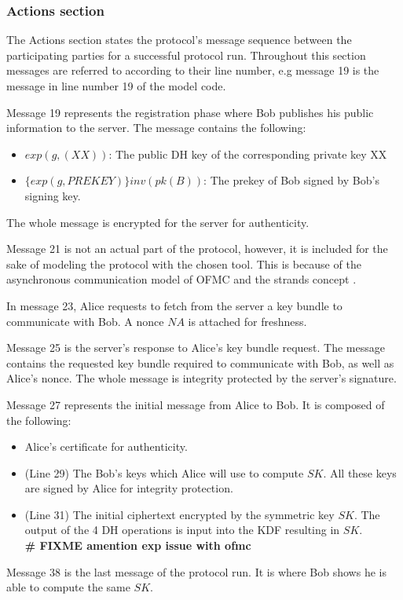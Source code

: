 \subsubsection{Actions section}
The Actions section states the protocol's message sequence between the participating parties for a successful protocol run. Throughout this section messages are referred to according to their line number, e.g message 19 is the message in line number 19 of the model code.
\par
Message 19 represents the registration phase where Bob publishes his public information to the server. The message contains the following:
\begin{itemize}
	\item $exp(g,(XX))$: The public DH key of the corresponding private key XX
	\item $\{exp(g,PREKEY)\}inv(pk(B))$: The prekey of Bob signed by Bob's signing key.
\end{itemize}
The whole message is encrypted for the server for authenticity.
\par
Message 21 is not an actual part of the protocol, however, it is included for the sake of modeling the protocol with the chosen tool. This is because of the asynchronous communication model of OFMC and the strands concept \cite{ofmcTut}.
\par 
In message 23, Alice requests to fetch from the server a key bundle to communicate with Bob. A nonce $NA$ is attached for freshness.
\par
Message 25 is the server's response to Alice's key bundle request. The message contains the requested key bundle required to communicate with Bob, as well as Alice's nonce. The whole message is integrity protected by the server's signature.
\par
Message 27 represents the initial message from Alice to Bob. It is composed of the following:
\begin{itemize}
	\item Alice's certificate for authenticity.
	\item (Line 29) The Bob's keys which Alice will use to compute $SK$. All these keys are signed by Alice for integrity protection.
	\item (Line 31) The initial ciphertext encrypted by the symmetric key $SK$. The output of the 4 DH operations is input into the KDF resulting in $SK$. \\\textbf{\LARGE \# FIXME amention exp issue with ofmc}
\end{itemize}
\par
Message 38 is the last message of the protocol run. It is where Bob shows he is able to compute the same $SK$. 
